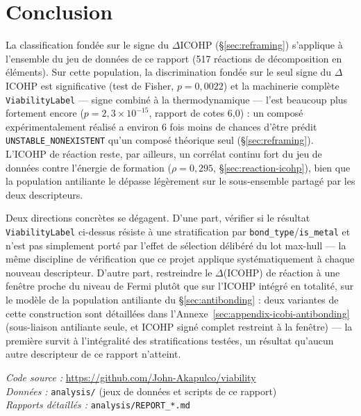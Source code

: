 \documentclass[11pt,a4paper]{article}
\begin{document}
\section{Conclusion}

La classification fondée sur le signe du $\Delta$ICOHP
(\S\ref{sec:reframing}) s'applique à
l'ensemble du jeu de données de ce rapport (517 réactions de
décomposition en éléments). Sur cette population, la discrimination
fondée sur le seul signe du $\Delta$ICOHP est significative
(test de Fisher, $p=0,0022$) et la machinerie complète
\texttt{ViabilityLabel} --- signe combiné à la thermodynamique --- l'est
beaucoup plus fortement encore ($p=2,3\times10^{-15}$, rapport de cotes
6,0) : un composé expérimentalement réalisé a environ 6 fois moins de
chances d'être prédit \texttt{UNSTABLE\_NONEXISTENT} qu'un composé
théorique seul (\S\ref{sec:reframing}). L'ICOHP de réaction reste, par
ailleurs, un corrélat continu fort du jeu de données contre l'énergie de
formation ($\rho=0,295$, \S\ref{sec:reaction-icohp}), bien que la
population antiliante le dépasse légèrement sur le
sous-ensemble partagé par les deux descripteurs.

Deux directions concrètes se dégagent. D'une part, vérifier si le
résultat \texttt{ViabilityLabel} ci-dessus résiste à une stratification
par \texttt{bond\_type}/\texttt{is\_metal} et n'est pas simplement porté
par l'effet de sélection délibéré du lot max-hull --- la même
discipline de vérification que ce projet applique systématiquement à
chaque nouveau descripteur. D'autre part, restreindre le $\Delta$(ICOHP) de
réaction à une fenêtre proche du niveau de Fermi plutôt que sur l'ICOHP
intégré en totalité, sur le modèle de la population antiliante du
\S\ref{sec:antibonding} : deux variantes de cette construction sont
détaillées dans l'Annexe~\ref{sec:appendix-icobi-antibonding}
(sous-liaison antiliante seule, et ICOHP signé complet restreint à la
fenêtre) --- la première survit à l'intégralité des stratifications
testées, un résultat qu'aucun autre descripteur de ce rapport n'atteint.

\vspace{1cm}
\noindent\textit{Code source :} \url{https://github.com/John-Akapulco/viability} \\
\noindent\textit{Données :} \texttt{analysis/} (jeux de données et scripts de ce rapport) \\
\noindent\textit{Rapports détaillés :} \texttt{analysis/REPORT\_*.md}

\appendix
\renewcommand{\thetable}{S\arabic{table}}
\setcounter{table}{0}
\end{document}
